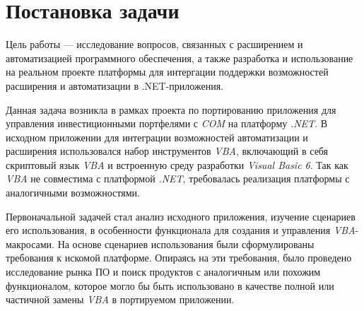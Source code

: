 \section{Постановка задачи}
\label{sec:problem_statement}

Цель работы --- исследование вопросов, связанных с расширением и автоматизацией программного обеспечения, а также разработка и использование на реальном проекте платформы для интергации поддержки возможностей расширения и автоматизации в .NET-приложения.

Данная задача возникла в рамках проекта по портированию приложения для управления инвестиционными портфелями с {\it COM} на платформу {\it .NET}. В исходном приложении для интеграции возможностей автоматизации и расширения использовался набор инструментов {\it VBA}, включающий в себя скриптовый язык {\it VBA} и встроенную среду разработки {\it Visual Basic 6}. Так как {\it VBA} не совместима с платформой {\it .NET}, требовалась реализация платформы с аналогичными возможностями. 

Первоначальной задачей стал анализ исходного приложения, изучение сценариев его использования, в особенности функционала для создания и управления {\it VBA}-макросами. На основе сценариев использования были сформулированы требования к искомой платформе. Опираясь на эти требования, было проведено исследование рынка ПО и поиск продуктов с аналогичным или похожим функционалом, которое могло бы быть использовано в качестве полной или частичной замены {\it VBA} в портируемом приложении.

\pagebreak